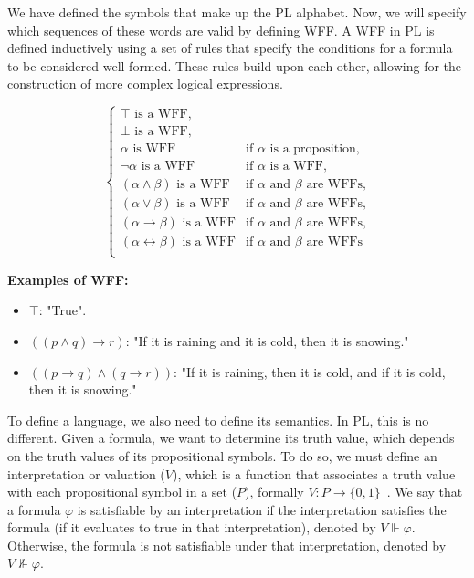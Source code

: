 We have defined the symbols that make up the \gls{PL} alphabet. Now, we will specify which sequences of these words are valid by defining \gls{WFF}. A \gls{WFF} in \gls{PL} is defined inductively using a set of rules that specify the conditions for a formula to be considered well-formed. These rules build upon each other, allowing for the construction of more complex logical expressions.

\[
\left\{
\begin{array}{ll}
\top \text{ is a WFF,}\\
\bot \text{ is a WFF,}\\
\alpha \text{ is WFF} & \text{if } \alpha \text{ is a proposition,}\\
\neg \alpha \text{ is a WFF} & \text{if } \alpha \text{ is a WFF,}\\
(\alpha \land \beta) \text{ is a WFF} & \text{if } \alpha \text{ and } \beta \text{ are WFFs,}\\
(\alpha \lor \beta) \text{ is a WFF} & \text{if } \alpha \text{ and } \beta \text{ are WFFs,} \\
(\alpha \rightarrow \beta) \text{ is a WFF} & \text{if } \alpha \text{ and } \beta \text{ are WFFs,} \\
(\alpha \leftrightarrow \beta) \text{ is a WFF} & \text{if } \alpha \text{ and } \beta \text{ are WFFs} \\
\end{array}
\right.
\]

\textbf{Examples of WFF:}
\begin{itemize}
    \renewcommand{\labelitemi}{}
    \item \(\top\): "True".
    \item \(((p \land q) \to r)\): "If it is raining and it is cold, then it is snowing."
    \item \(((p \to q) \land (q \to r))\): "If it is raining, then it is cold, and if it is cold, then it is snowing."
\end{itemize}

To define a language, we also need to define its semantics. In \gls{PL}, this is no different. Given a formula, we want to determine its truth value, which depends on the truth values of its propositional symbols. To do so, we must define an interpretation or valuation (\(V\)), which is a function that associates a truth value with each propositional symbol in a set (\(P\)), formally \(V: P \to \{0,1\}\)~\cite{gouveia_lgica}. We say that a formula \(\varphi\) is satisfiable by an interpretation if the interpretation satisfies the formula (if it evaluates to true in that interpretation), denoted by \(V \Vdash \varphi\). Otherwise, the formula is not satisfiable under that interpretation, denoted by \(V \nVDash \varphi\). 

